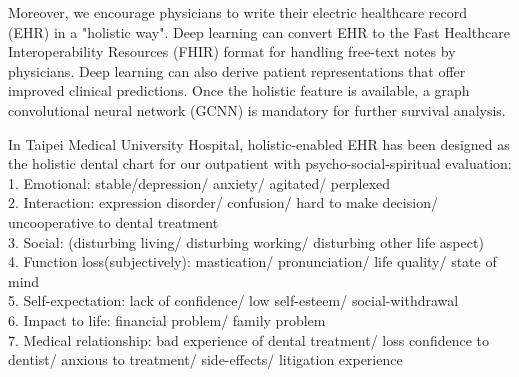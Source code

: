 \documentclass[jpm,article,submit,moreauthors,pdftex]{Definitions/mdpi}
\begin{document}
\begin{paracol}{2}
Moreover, we encourage physicians to write their electric healthcare record (EHR) in a "holistic way".
Deep learning can convert EHR to the Fast Healthcare Interoperability Resources (FHIR) format\cite{Rajkomar2018}\cite{HealthLevelSeven2019} for handling free-text notes by physicians.
Deep learning can also derive patient representations that offer improved clinical predictions\cite{Miotto2016}.
Once the holistic feature is available, a graph convolutional neural network (GCNN) is mandatory for further survival analysis\cite{Ching2018a}.

In Taipei Medical University Hospital, holistic-enabled EHR has been designed as the holistic dental chart for our outpatient with psycho-social-spiritual evaluation\cite{Ling-ChengMong2021}:\\
1. Emotional: stable/depression/ anxiety/ agitated/ perplexed\\
2. Interaction: expression disorder/ confusion/ hard to make decision/ uncooperative to dental treatment\\
3. Social: (disturbing living/ disturbing working/ disturbing other life aspect)\\
4. Function loss(subjectively): mastication/ pronunciation/ life quality/ state of mind\\
5. Self-expectation: lack of confidence/ low self-esteem/ social-withdrawal\\
6. Impact to life: financial problem/ family problem\\
7. Medical relationship: bad experience of dental treatment/ loss confidence to dentist/ anxious to treatment/ side-effects/ litigation experience\\[0.1cm]


\end{paracol}
\end{document}
